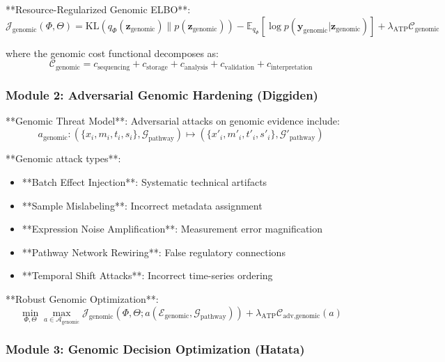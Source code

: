\documentclass[12pt,a4paper]{article}
\begin{document}
**Resource-Regularized Genomic ELBO**:
\begin{equation}
\mathcal{J}_{\text{genomic}}(\Phi,\Theta) = \text{KL}(q_{\Phi}(\mathbf{z}_{\text{genomic}}) \| p(\mathbf{z}_{\text{genomic}})) - \mathbb{E}_{q_{\Phi}}[\log p(\mathbf{y}_{\text{genomic}}|\mathbf{z}_{\text{genomic}})] + \lambda_{\text{ATP}} \mathcal{C}_{\text{genomic}}
\end{equation}

where the genomic cost functional decomposes as:
\begin{equation}
\mathcal{C}_{\text{genomic}} = c_{\text{sequencing}} + c_{\text{storage}} + c_{\text{analysis}} + c_{\text{validation}} + c_{\text{interpretation}}
\end{equation}

\subsubsection{Module 2: Adversarial Genomic Hardening (Diggiden)}

**Genomic Threat Model**: Adversarial attacks on genomic evidence include:
\begin{equation}
a_{\text{genomic}}: (\{x_i,m_i,t_i,s_i\}, \mathcal{G}_{\text{pathway}}) \mapsto (\{x'_i,m'_i,t'_i,s'_i\}, \mathcal{G}'_{\text{pathway}})
\end{equation}

**Genomic attack types**:
\begin{itemize}
\item **Batch Effect Injection**: Systematic technical artifacts
\item **Sample Mislabeling**: Incorrect metadata assignment  
\item **Expression Noise Amplification**: Measurement error magnification
\item **Pathway Network Rewiring**: False regulatory connections
\item **Temporal Shift Attacks**: Incorrect time-series ordering
\end{itemize}

**Robust Genomic Optimization**:
\begin{equation}
\min_{\Phi,\Theta} \max_{a \in \mathcal{A}_{\text{genomic}}} \mathcal{J}_{\text{genomic}}(\Phi,\Theta; a(\mathcal{E}_{\text{genomic}},\mathcal{G}_{\text{pathway}})) + \lambda_{\text{ATP}} \mathcal{C}_{\text{adv,genomic}}(a)
\end{equation}

\subsubsection{Module 3: Genomic Decision Optimization (Hatata)}
\end{document}
